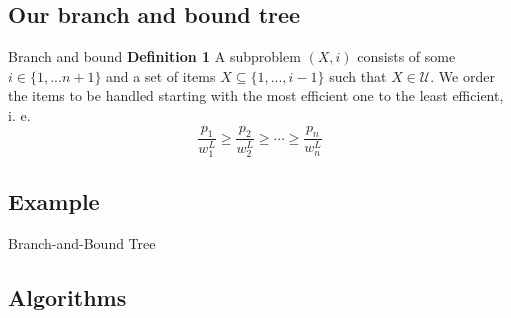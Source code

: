 \documentclass[fleqn,11pt,aspectratio=43]{beamer}
\begin{document}
\subsection{Our branch and bound tree}


\begin{frame}{Branch and bound}
    \textbf{Definition 1}
    A subproblem $ (X,i)$ consists of some $i \in \{1,...n+1\}$ and a set of items $X \subseteq \{1,...,i-1\}$ such that $X \in \mathcal{U}$. We order the items to be handled starting with the most efficient one to the least efficient, i. e.
\[\frac{p_1}{w_1^L} \geq \frac{p_2}{w_2^L} \geq \cdots \geq \frac{p_n}{w_n^L}\]
\end{frame}



\subsection{Example}


\begin{frame}{Branch-and-Bound Tree}
\centering
{}
\end{frame}







\subsection{Algorithms}
\end{document}
